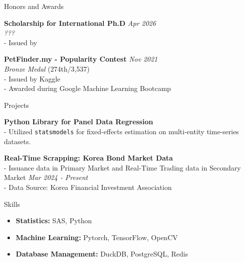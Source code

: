 \documentclass{resume} %
\begin{document}
\begin{rSection}{Honors and Awards}

{\bf Scholarship for International Ph.D} \hfill {\em Apr 2026}
\\ \textit{???} 
\\ - Issued by 

{\bf PetFinder.my - Popularity Contest} \hfill {\em Nov 2021}
\\ \textit{Bronze Medal} {\small (274th/3,537)}
\\ - Issued by Kaggle
\\ - Awarded during Google Machine Learning Bootcamp

\end{rSection}


\begin{rSection}{Projects}

{\bf Python Library for Panel Data Regression}
\\- Utilized \texttt{statsmodels} for fixed-effects estimation on multi-entity time-series datasets. 

{\bf Real-Time Scrapping: Korea Bond Market Data }
\\- Issuance data in Primary Market and Real-Time Trading data in Secondary Market \hfill {\em Mar 2024 - Present}
\\- Data Source: Korea Financial Investment Association

\end{rSection}


\begin{rSection}{Skills}
\begin{itemize}
    \item {\bf Statistics:} SAS, Python
    \item {\bf Machine Learning:} Pytorch, TensorFlow, OpenCV
    \item {\bf Database Management:} DuckDB, PostgreSQL, Redis
\end{itemize}
\end{rSection}
\end{document}
